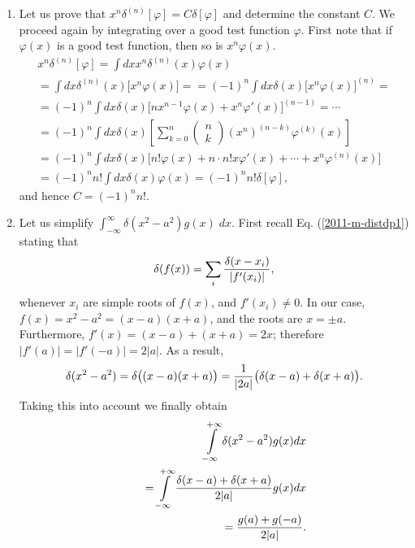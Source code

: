 {\begin{enumerate}
\item
Let us prove that
$x^n\delta^{(n)}[\varphi]=C\delta [\varphi]$    and determine the constant $C$.
We proceed again by integrating over a good test function $\varphi$.
First note that if
$\varphi (x)$ is a good test function, then so is
$x^n\varphi (x)$.
 \begin{equation}
\begin{split}
    x^n\delta^{(n)}[\varphi] =
   \int dx x^n\delta^{(n)}(x)\varphi(x) \\  =
   \int dx \delta^{(n)}(x)\bigl[x^n\varphi(x)\bigr]=
   =(-1)^n \int dx \delta(x)\bigl[x^n\varphi(x)\bigr]^{(n)}=\\
  =(-1)^n \int dx \delta(x)\bigl[nx^{n-1}\varphi(x)+x^n\varphi'(x)
   \bigr]^{(n-1)}=
 \cdots \\
   =(-1)^n \int dx \delta(x)\left[\sum_{k=0}^n
           \left(
          \begin{array}{c}
          n\\ k
           \end{array}\right) (x^n)^{(n-k)}\varphi ^{(k)}(x)\right]
    \\
   =(-1)^n \int dx
\delta(x)\bigl[n!\varphi(x)+n\cdot n!x\varphi'(x) +
\cdots +x^n\varphi^{(n)}(x)
   \bigr] \\
   =(-1)^n n! \int dx \delta(x)\varphi(x)
   =(-1)^n n!  \delta[\varphi ]
,
\end{split}
\end{equation}
and hence  $ C=(-1)^n n!$.


\item
Let us simplify $\int_{-\infty}^\infty \delta (x^2-a^2)g(x)\; dx$.
First recall Eq. (\ref{2011-m-distdp1})  stating that
$$
   \delta(f(x))=\sum_{i}{\delta(x-x_i)\over|f'(x_i)|},
$$
whenever $x_i$ are simple roots of  $f(x)$, and $f'(x_i)\neq 0$.
In our case, $
   f(x)=x^2-a^2=(x-a)(x+a)
$, and the roots are  $x=\pm a$.
Furthermore,
$
   f'(x)=(x-a)+(x+a)= 2x
$; therefore
$
   |f'(a)|=|f'(-a)|=2|a|$.
As a result,
$$
    \delta(x^2-a^2)=\delta\bigl((x-a)(x+a)\bigr)={1\over|2a|}
   \bigl(\delta(x-a)+\delta(x+a)\bigr).
$$
Taking this into account we finally obtain
 \begin{equation}
\begin{split}
  \int\limits_{-\infty}^{+\infty}\delta(x^2-a^2)
   g(x)dx\\
\qquad =
\int\limits_{-\infty}^{+\infty}{\delta(x-a)+\delta(x+a)\over
   2|a|}g(x)dx\\
\qquad =    {g(a)+g(-a)\over2|a|}.
\end{split}
\end{equation}



\end{enumerate}}
